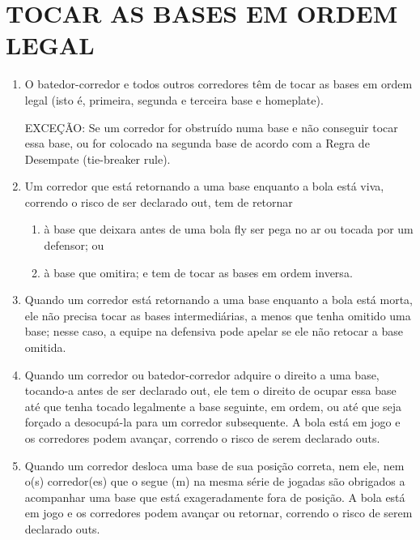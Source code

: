 \section{TOCAR AS BASES EM ORDEM LEGAL} 
\begin{multicols}{2}
	
	\begin{enumerate}[label=\alph*)]
		\item O batedor-corredor e todos outros corredores t\^em de tocar as bases em ordem legal (isto \'e, primeira, segunda e terceira base e \gls{homeplate}). 
		
		EXCE\c{C}\~AO: Se um corredor for obstru\'ido numa base e n\~ao conseguir tocar essa base, ou for colocado na segunda base de acordo com a Regra de Desempate (\Gls{tie-breaker rule}). 
		
		\item Um corredor que est\'a retornando a uma base enquanto a bola est\'a viva, correndo o risco de ser declarado \gls{out}, tem de retornar 
		
		\begin{enumerate}[label=\roman*.]
			\item \`a base que deixara antes de uma bola \gls{fly} ser pega no ar ou tocada por um defensor; ou 
			\item \`a base que omitira; e tem de tocar as bases em ordem inversa. 
		\end{enumerate}
		\item Quando um corredor est\'a retornando a uma base enquanto a bola est\'a morta, ele n\~ao precisa tocar as bases intermedi\'arias, a menos que tenha omitido uma base; nesse caso, a equipe na defensiva pode apelar se ele n\~ao retocar a base omitida. 
		\item Quando um corredor ou batedor-corredor adquire o direito a uma base, tocando-a antes de ser declarado \gls{out}, ele tem o direito de ocupar essa base at\'e que tenha tocado legalmente a base seguinte, em ordem, ou at\'e que seja for\c{c}ado a desocup\'a-la para um corredor subsequente. A bola est\'a em jogo e os corredores podem avan\c{c}ar, correndo o risco de serem declarado \gls{out}s. 
		
		\item Quando um corredor desloca uma base de sua posi\c{c}\~ao correta, nem ele, nem o(s) corredor(es) que o segue (m) na mesma s\'erie de jogadas s\~ao obrigados a acompanhar uma base que est\'a exageradamente fora de posi\c{c}\~ao. A bola est\'a em jogo e os corredores podem avan\c{c}ar ou retornar, correndo o risco de serem declarado \gls{out}s. 
		

\end{enumerate}
\end{multicols}
